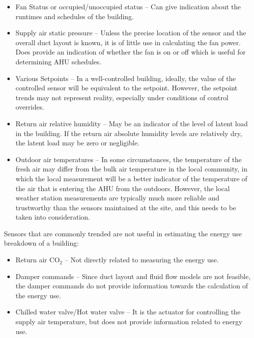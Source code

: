 \begin{itemize}
\item Fan Status or occupied/unoccupied status -- Can give indication about the runtimes and schedules of the building.
\item Supply air static pressure -- Unless the precise location of the sensor and the overall duct layout is known, it is of little use in calculating the fan power. Does provide an indication of whether the fan is on or off which is useful for determining AHU schedules.
\item Various Setpoints -- In a well-controlled building, ideally, the value of the controlled sensor will be equivalent to the setpoint. However, the setpoint trends may not represent reality, especially under conditions of control overrides. 
\item Return air relative humidity -- May be an indicator of the level of latent load in the building. If the return air absolute humidity levels are relatively dry, the latent load may be zero or negligible. 
\item Outdoor air temperatures -- In some circumstances, the temperature
    of the fresh air may differ from the bulk air temperature in the
    local community, in which the local measurement will be a better
    indicator of the temperature of the air that is entering the AHU
    from the outdoors. However, the local weather station measurements
    are typically much more reliable and trustworthy than the sensors
    maintained at the site, and this needs to be taken into
    consideration.
\end{itemize}

Sensors that are commonly trended are not useful in estimating the energy use breakdown of a building:
\begin{itemize}
\item Return air CO\(_2\) -- Not directly related to measuring the energy use.
\item Damper commands -- Since duct layout and fluid flow models are not feasible, the damper commands do not provide information towards the calculation of the energy use. 
\item Chilled water valve/Hot water valve -- It is the actuator for controlling the supply air temperature, but does not provide information related to energy use.
\end{itemize}





